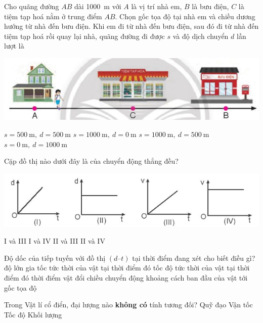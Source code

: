\begin{ex}
	Cho quãng đường $AB$ dài \SI{1000}{\meter} với $A$ là vị trí nhà em, $B$ là bưu điện, $C$ là tiệm tạp hoá nằm ở trung điểm $AB$.  
	Chọn gốc tọa độ tại nhà em và chiều dương hướng từ nhà đến bưu điện.  
	Khi em đi từ nhà đến bưu điện, sau đó đi từ nhà đến tiệm tạp hoá rồi quay lại nhà, quãng đường đi được $s$ và độ dịch chuyển $d$ lần lượt là  
	\begin{center}
		\includegraphics[scale=1.0]{figs/G10Y25B5-15}
	\end{center}
	\choice
	{$s=\SI{500}{\meter},\ d=\SI{500}{\meter}$}
	{\True $s=\SI{1000}{\meter},\ d=\SI{0}{\meter}$}
	{$s=\SI{1000}{\meter},\ d=\SI{500}{\meter}$}
	{$s=\SI{0}{\meter},\ d=\SI{1000}{\meter}$}
	\loigiai{}
\end{ex}

\begin{ex}
	Cặp đồ thị nào dưới đây là của chuyển động thẳng đều?
	\begin{center}
		\includegraphics[scale=0.6]{figs/G10Y25B5-2}
	\end{center}
	\choice
	{I và III}
	{\True I và IV}
	{II và III}
	{II và IV}
	\loigiai{}
\end{ex}

\begin{ex}
	Độ dốc của tiếp tuyến với đồ thị $(d\text{–}t)$ tại thời điểm đang xét cho biết điều gì?
	\choice
	{độ lớn gia tốc tức thời của vật tại thời điểm đó}
	{\True tốc độ tức thời của vật tại thời điểm đó}
	{thời điểm vật đổi chiều chuyển động}
	{khoảng cách ban đầu của vật tới gốc tọa độ}
	\loigiai{}
\end{ex}

\begin{ex}
	Trong Vật lí cổ điển, đại lượng nào \textbf{không có} tính tương đối?
	\choice
	{Quỹ đạo}
	{Vận tốc}
	{Tốc độ}
	{\True Khối lượng}
	\loigiai{}
\end{ex}

